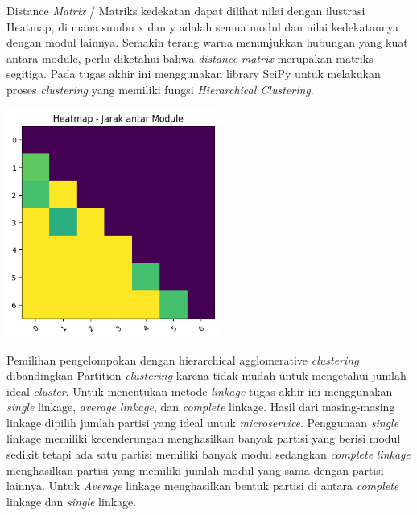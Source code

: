 Distance \textit{Matrix} / Matriks kedekatan dapat dilihat nilai dengan ilustrasi Heatmap, di mana sumbu x dan y adalah semua modul dan nilai kedekatannya dengan modul lainnya. Semakin terang warna menunjukkan hubungan yang kuat antara module, perlu diketahui bahwa \textit{distance} \textit{matrix} merupakan matriks segitiga. Pada tugas akhir ini menggunakan library SciPy untuk melakukan proses \textit{clustering} yang memiliki fungsi \textit{Hierarchical Clustering}.

\begin{center}
	\includegraphics[width=7cm]{img/bab_3/heatmap.png}
	\label{fig:asd}
\end{center}

Pemilihan pengelompokan dengan hierarchical agglomerative \textit{clustering} dibandingkan Partition \textit{clustering} karena tidak mudah untuk mengetahui jumlah ideal \textit{cluster}. Untuk menentukan metode \textit{linkage} tugas akhir ini menggunakan \textit{single} linkage, \textit{average} \textit{linkage}, dan \textit{complete} linkage. Hasil dari masing-masing linkage dipilih jumlah partisi yang ideal untuk \textit{microservice}. Penggunaan \textit{single} linkage memiliki kecenderungan menghasilkan banyak partisi yang berisi modul sedikit tetapi ada satu partisi memiliki banyak modul sedangkan \textit{complete} \textit{linkage} menghasilkan partisi yang memiliki jumlah modul yang sama dengan partisi lainnya. Untuk \textit{Average} linkage menghasilkan bentuk partisi di antara \textit{complete} linkage dan \textit{single} linkage.

